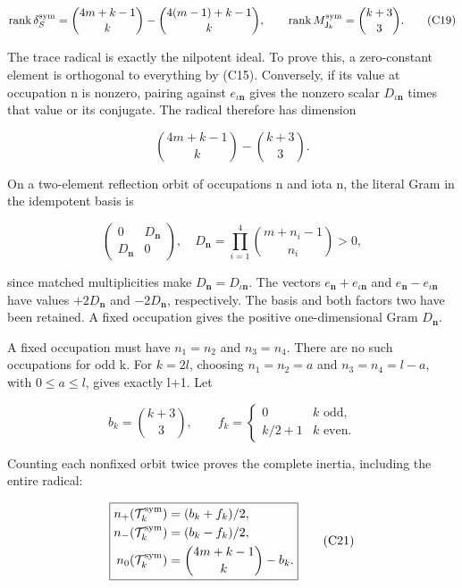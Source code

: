 \[
\operatorname{rank}\delta_S^{\rm sym}
=\binom{4m+k-1}{k}-\binom{4(m-1)+k-1}{k},
\qquad\operatorname{rank}M_{\mathsf J_k}^{\rm sym}
=\binom{k+3}{3}.
\tag{C19}
\]

The trace radical is exactly the nilpotent ideal. To prove this, a zero-constant element is orthogonal to everything by (C15). Conversely, if its value at occupation n is nonzero, pairing against \(e_{\iota\boldsymbol n}\) gives the nonzero scalar \(D_{\iota\boldsymbol n}\) times that value or its conjugate. The radical therefore has dimension

\[
\binom{4m+k-1}{k}-\binom{k+3}{3}.
\tag{C20}
\]

On a two-element reflection orbit of occupations n and iota n, the literal Gram in the idempotent basis is

\[
\begin{pmatrix}0&D_{\boldsymbol n}\\D_{\boldsymbol n}&0\end{pmatrix},
\quad
D_{\boldsymbol n}=\prod_{i=1}^4\binom{m+n_i-1}{n_i}>0,
\]

since matched multiplicities make \(D_{\boldsymbol n}=D_{\iota\boldsymbol n}\). The vectors \(e_{\boldsymbol n}+e_{\iota\boldsymbol n}\) and \(e_{\boldsymbol n}-e_{\iota\boldsymbol n}\) have values \(+2D_{\boldsymbol n}\) and \(-2D_{\boldsymbol n}\), respectively. The basis and both factors two have been retained. A fixed occupation gives the positive one-dimensional Gram \(D_{\boldsymbol n}\).

A fixed occupation must have \(n_1=n_2\) and \(n_3=n_4\). There are no such occupations for odd k. For \(k=2l\), choosing \(n_1=n_2=a\) and \(n_3=n_4=l-a\), with \(0\le a\le l\), gives exactly l+1. Let

\[
b_k=\binom{k+3}{3},\qquad
f_k=\begin{cases}0&k\text{ odd},\\k/2+1&k\text{ even}.\end{cases}
\]

Counting each nonfixed orbit twice proves the complete inertia, including the entire radical:

\[
\boxed{\begin{aligned}
n_+(\mathcal T_k^{\rm sym})&=(b_k+f_k)/2,\\
n_-(\mathcal T_k^{\rm sym})&=(b_k-f_k)/2,\\
n_0(\mathcal T_k^{\rm sym})&=\binom{4m+k-1}{k}-b_k.
\end{aligned}}
\tag{C21}
\]


